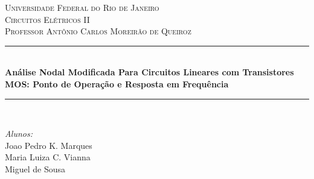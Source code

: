 \documentclass[a4paper,12pt]{article} %
\begin{document}


\begin{titlepage}
\thispagestyle{plain}
\newcommand{\HRule}{\rule{\linewidth}{0.5mm}} %

\center %

\textsc{\LARGE Universidade Federal do Rio de Janeiro}\\[1.5cm] %
\textsc{\Large Circuitos Elétricos II}\\[0.5cm] %
\textsc{\large Professor Antônio Carlos Moreirão de Queiroz}\\[0.5cm] %

\HRule \\[0.4cm]
{ \huge \bfseries Análise Nodal Modificada
	Para Circuitos Lineares com Transistores MOS: Ponto de Operação e Resposta em Frequência}\\[0.4cm] %
\HRule \\[1.5cm]
\vspace*{5cm}
\hspace*{10cm}
\begin{minipage}{0.4\textwidth}
\begin{flushleft} \large
\emph{Alunos:}\\
Joao Pedro K. Marques\\Maria Luiza C. Vianna\\Miguel de Sousa\\ %
\end{flushleft}
\end{minipage}
~



\end{titlepage}
\end{document}
